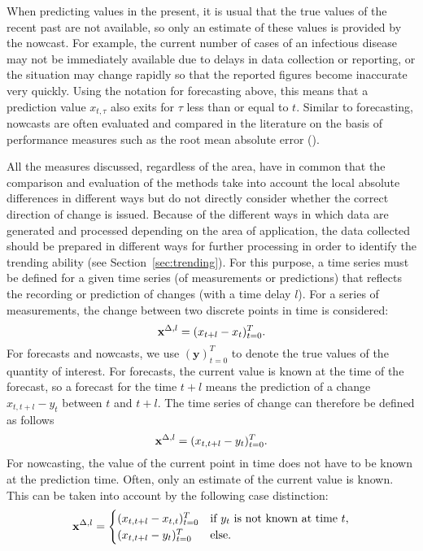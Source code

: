 When predicting values in the present, it is usual that the true values of the recent past are not available, so only an estimate of these values is provided by the nowcast. For example, the current number of cases of an infectious disease may not be immediately available due to delays in data collection or reporting, or the situation may change rapidly so that the reported figures become inaccurate very quickly.
Using the notation for forecasting above, this means that a prediction value $x_{t,\tau}$ also exits for $\tau$ less than or equal to $t$.
Similar to forecasting, nowcasts are often evaluated and compared in the literature on the basis of performance measures such as the root mean absolute error (\cite{gunther2021nowcasting}).

All the measures discussed, regardless of the area, have in common that the comparison and evaluation of the methods take into account the local absolute differences in different ways but do not directly consider whether the correct direction of change is issued.
Because of the different ways in which data are generated and processed depending on the area of application, the data collected should be prepared in different ways for further processing in order to identify the trending ability (see Section~\ref{sec:trending}). For this purpose, a time series must be defined for a given time series (of measurements or predictions) that reflects the recording or prediction of changes (with a time delay $l$). For a series of measurements, the change between two discrete points in time is considered:
\begin{equation}
    \mathbf{x}^{\Delta,l} = (x_{t+l} -x_{t})^T_{t=0}. \label{eq:diffxl_measure}
\end{equation}
For forecasts and nowcasts, we use $(\mathbf{y})^T_{t=0}$ to denote the true values of the quantity of interest. For forecasts, the current value is known at the time of the forecast, so a forecast for the time $t+l$ means the prediction of a change $x_{t,t+l} -y_{t}$ between $t$ and $t+l$. The time series of change can therefore be defined as follows 
\begin{equation}
    \mathbf{x}^{\Delta,l} = (x_{t,t+l} -y_{t})^T_{t=0}.\label{eq:diffxl_forecasting}
\end{equation}
For nowcasting, the value of the current point in time does not have to be known at the prediction time. Often, only an estimate of the current value is known. This can be taken into account by the following case distinction:
\begin{equation}
\mathbf{x}^{\Delta,l} = 
\begin{cases} 
(x_{t,t+l} -x_{t,t})^T_{t=0} & \text{if } y_{t} \text{ is not known at time } t, \\
(x_{t,t+l} -y_{t})^T_{t=0}  & \text{else}.
\end{cases} \label{eq:diffxl_nowcasting}
\end{equation}



